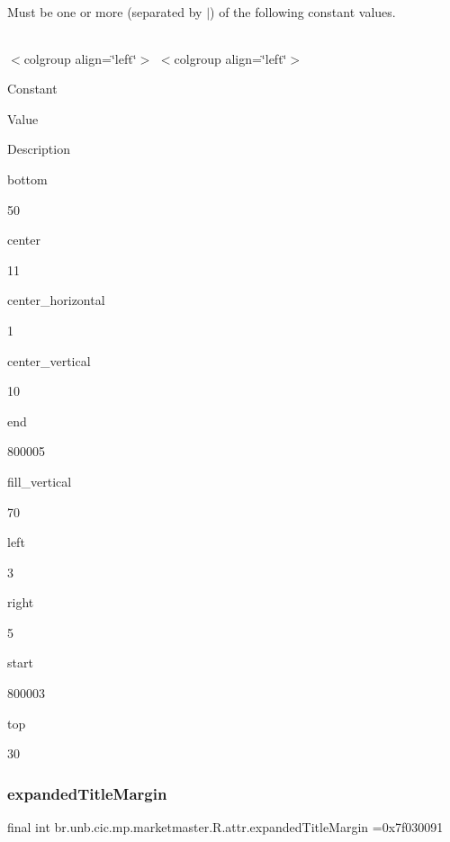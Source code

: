 Must be one or more (separated by \textquotesingle{}$\vert$\textquotesingle{}) of the following constant values.

\tabulinesep=1mm
\begin{longtabu} spread 0pt [c]{*{0}{|X[-1]}|}
\hline
\end{longtabu}
$<$colgroup align=\char`\"{}left\char`\"{}$>$ $<$colgroup align=\char`\"{}left\char`\"{}$>$ 

Constant

Value

Description 

bottom

50

center

11

center\+\_\+horizontal

1

center\+\_\+vertical

10

end

800005

fill\+\_\+vertical

70

left

3

right

5

start

800003

top

30\mbox{\label{classbr_1_1unb_1_1cic_1_1mp_1_1marketmaster_1_1R_1_1attr_a34b70d22a29fa5e5a574ad3797bae8b7}} 
\subsubsection{\texorpdfstring{expanded\+Title\+Margin}{expandedTitleMargin}}
{\footnotesize\ttfamily final int br.\+unb.\+cic.\+mp.\+marketmaster.\+R.\+attr.\+expanded\+Title\+Margin =0x7f030091\hspace{0.3cm}{\ttfamily [static]}}

